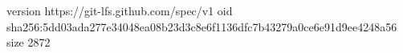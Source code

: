 version https://git-lfs.github.com/spec/v1
oid sha256:5dd03ada277e34048ea08b23d3c8e6f1136dfc7b43279a0ce6e91d9ee4248a56
size 2872
